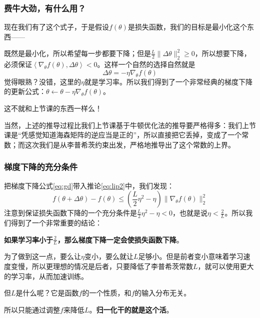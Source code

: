 \documentclass{ctexbeamer}
\begin{document}
\begin{frame}
    \frametitle{费牛大劲，有什么用？}

    现在我们有了这个式子，于是假设$f(\theta)$是损失函数，我们的目标是最小化这个东西——
    
    既然是最小化，所以希望每一步都要下降；但是$\frac{L}{2} \|\Delta \theta\|_2^2 \geqslant 0$，所以想要下降，必须保证$\left\langle \nabla_\theta f(\theta), \Delta \theta \right\rangle < 0$。这样一个自然的选择自然就是
\begin{equation}\label{eq:gd}
\Delta \theta = -\eta \nabla_\theta f(\theta)
\end{equation}
    觉得眼熟？没错，这里的$\eta$就是学习率。所以我们得到了一个非常经典的梯度下降的更新公式：$\theta \leftarrow \theta - \eta \nabla_\theta f(\theta)$。

    这不就和上节课的东西一样么！

    当然，上述的推导过程比我们上节课基于牛顿优化法的推导要严格得多：我们上节课是“凭感觉知道海森矩阵的逆应当是正的”，所以直接把它丢掉，变成了一个常数；而这次我们是从李普希茨约束出发，严格地推导出了这个常数的上界。

\end{frame}

\begin{frame}
    \frametitle{梯度下降的充分条件}

    把梯度下降公式\ref{eq:gd}带入推论\ref{eq:lip2}中，我们发现：
    \begin{equation}
f(\theta + \Delta \theta) - f(\theta) \leqslant  \left(\frac{L}{2} \eta^2 - \eta\right) \|\nabla_\theta f(\theta)\|_2^2
    \end{equation}
    注意到保证损失函数下降的一个充分条件是$\frac{L}{2} \eta^2 - \eta < 0$，也就是说$\eta < \frac{2}{L}$。所以我们得到了一个非常重要的结论：
    
    \textbf{如果学习率小于$\frac{2}{L}$，那么梯度下降一定会使损失函数下降}。

    为了做到这一点，要么让$\eta$变小，要么就让$L$足够小。但是前者变小意味着学习速度变慢，所以更理想的情况是后者，只要降低了李普希茨常数$L$，就可以使用更大的学习率，从而加速训练。

    但$L$是什么呢？它是函数$f$的一个性质，和$f$的输入分布无关。

    所以只能通过调整$f$来降低$L$。\textbf{归一化干的就是这个活}。

\end{frame}
\end{document}
